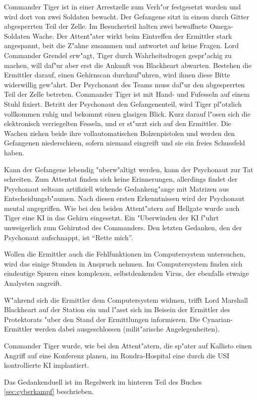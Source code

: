 Commander Tiger ist in einer Arrestzelle zum Verh"or festgesetzt worden und wird dort von zwei Soldaten bewacht. Der Gefangene sitzt in einem durch Gitter abgesperrten Teil der Zelle. Im Besucherteil halten zwei bewaffnete Omega-Soldaten Wache. Der Attent"ater wirkt beim Eintreffen der Ermittler stark angespannt, bei\3t die Z"ahne zusammen und antwortet auf keine Fragen. Lord Commander Grendel erw"agt, Tiger durch Wahrheitsdrogen gespr"achig zu machen, will daf"ur aber erst die Ankunft von Blackheart abwarten. Bestehen die Ermittler darauf, einen Gehirnscan durchzuf"uhren, wird ihnen diese Bitte widerwillig gew"ahrt. Der Psychonaut des Teams muss daf"ur den abgesperrten Teil der Zelle betreten. Commander Tiger ist mit Hand- und Fu\3fesseln auf einem Stuhl fixiert. Betritt der Psychonaut den Gefangenenteil, wird Tiger pl"otzlich vollkommen ruhig und bekommt einen glasigen Blick. Kurz darauf l"osen sich die elektronisch verriegelten Fesseln, und er st"urzt sich auf den Ermittler. Die Wachen ziehen beide ihre vollautomatischen Bolzenpistolen und werden den Gefangenen niederschie\3en, sofern niemand eingreift und sie ein freies Schussfeld haben.

Kann der Gefangene lebendig "uberw"altigt werden, kann der Psychonaut zur Tat schreiten. Zum Attentat finden sich keine Erinnerungen, allerdings findet der Psychonaut seltsam artifiziell wirkende Gedankeng"ange mit Matrizen aus Entscheidungsb"aumen. Nach diesen ersten Erkenntnissen wird der Psychonaut mental angegriffen. Wie bei den beiden Attent"atern auf Hellgate wurde auch Tiger eine KI in das Gehirn eingesetzt. Ein "Uberwinden der KI f"uhrt unweigerlich zum Gehirntod des Commanders. Den letzten Gedanken, den der Psychonaut aufschnappt, ist "`Rette mich"'.

Wollen die Ermittler auch die Fehlfunktionen im Computersystem untersuchen, wird das einige Stunden in Anspruch nehmen. Im Computersystem finden sich eindeutige Spuren eines komplexen, selbstdenkenden Virus, der ebenfalls etwaige Analysten angreift.

W"ahrend sich die Ermittler dem Computersystem widmen, trifft Lord Marshall Blackheart auf der Station ein und l"asst sich im Beisein der Ermittler des Protektorats "uber den Stand der Ermittlungen informieren. Die Cynarian-Ermittler werden dabei ausgeschlossen (milit"arische Angelegenheiten).

\begin{remarks}
	Commander Tiger wurde, wie bei den Attent"atern, die sp"ater auf Kallisto einen Angriff auf eine Konferenz planen, im Rondra-Hospital eine durch die USI kontrollierte KI implantiert.

	Das Gedankenduell ist im Regelwerk im hinteren Teil des Buches \cref{sec:cyberkampf} beschrieben.
\end{remarks}
